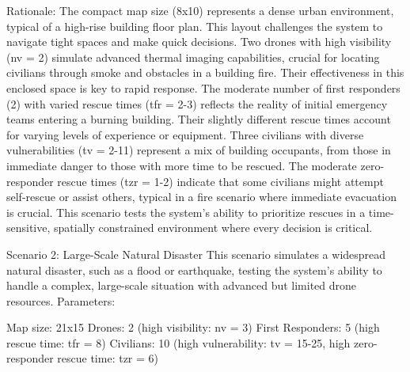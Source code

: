 Rationale:
The compact map size (8x10) represents a dense urban environment, typical of a high-rise building floor plan. This layout challenges the system to navigate tight spaces and make quick decisions.
Two drones with high visibility (nv = 2) simulate advanced thermal imaging capabilities, crucial for locating civilians through smoke and obstacles in a building fire. Their effectiveness in this enclosed space is key to rapid response.
The moderate number of first responders (2) with varied rescue times (tfr = 2-3) reflects the reality of initial emergency teams entering a burning building. Their slightly different rescue times account for varying levels of experience or equipment.
Three civilians with diverse vulnerabilities (tv = 2-11) represent a mix of building occupants, from those in immediate danger to those with more time to be rescued. The moderate zero-responder rescue times (tzr = 1-2) indicate that some civilians might attempt self-rescue or assist others, typical in a fire scenario where immediate evacuation is crucial.
This scenario tests the system's ability to prioritize rescues in a time-sensitive, spatially constrained environment where every decision is critical.

Scenario 2: Large-Scale Natural Disaster
This scenario simulates a widespread natural disaster, such as a flood or earthquake, testing the system's ability to handle a complex, large-scale situation with advanced but limited drone resources.
Parameters:

Map size: 21x15
Drones: 2 (high visibility: nv = 3)
First Responders: 5 (high rescue time: tfr = 8)
Civilians: 10 (high vulnerability: tv = 15-25, high zero-responder rescue time: tzr = 6)

